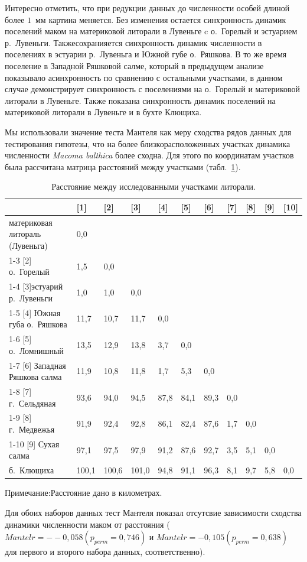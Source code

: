 Интересно отметить, что при редукции данных до численности особей длиной более $1$~мм картина меняется.
Без изменения остается синхронность динамик поселений маком на материковой литорали в Лувеньге c о.~Горелый и эстуарием р.~Лувеньги.
Такжесохранияется синхронность динамик численности в поселениях в эстуарии р.~Лувеньга и Южной губе о.~Ряшкова.
В то же время поселение в Западной Ряшковой салме, который в предыдущем анализе показывало асинхронность по сравнению с остальными участками, в данном случае демонстрирует синхронность с поселениями на о.~Горелый и материковой литорали в Лувеньге.
Также показана синхронность динамик поселений на материковой литорали в Лувеньге и в бухте Клющиха.

Мы использовали значение теста Мантеля как меру сходства рядов данных для тестирования гипотезы, что на более близкорасположенных участках динамика численности {\it Macoma balthica} более сходна.
Для этого по координатам участков была рассчитана матрица расстояний между участками (табл.~\ref{tab:distance_area_km}).
	\begin{table}[ht]
	\caption{Расстояние между исследованными участками литорали.}
	\label{tab:distance_area_km}
        \begin{tabular}{|p{}|*{10}{p{}|}} \hline
	 & [1] & [2] & [3] & [4] & [5] & [6] & [7] & [8] & [9] & [10]
	\\ \hline
	[1] материковая литораль (Лувеньга) & 0,0 &  &  &  &  &  &  &  &  & 
	\\ \cline{1-3}
	[2] о.~Горелый & 1,5 & 0,0 &  &  &  &  &  &  &  &  
	\\ \cline{1-4}
	[3]эстуарий р.~Лувеньги & 1,0 & 1,0 & 0,0 &  &  &  &  &  &  &  
	\\ \cline{1-5}
	[4] Южная губа о.~Ряшкова & 11,7 & 10,7 & 11,7 & 0,0 &  &  &  &  &  & 
	\\ \cline{1-6}
	[5] о.~Ломнишный & 13,5 & 12,9 & 13,8 & 3,7 & 0,0 &  &  &  &  &  
	\\ \cline{1-7}
	[6] Западная Ряшкова салма & 11,9 & 10,8 & 11,8 & 1,7 & 5,3 & 0,0 &  &  &  &  
	\\ \cline{1-8}
	[7] г.~Сельдяная & 93,6 & 94,0 & 94,5 & 87,8 & 84,1 & 89,3 & 0,0 &  &  &  
	\\ \cline{1-9}
	[8] г.~Медвежья & 91,9 & 92,4 & 92,8 & 86,1 & 82,4 & 87,6 & 1,7 & 0,0 &  &  
	\\ \cline{1-10}
	[9] Сухая салма & 97,1 & 97,5 & 97,9 & 91,2 & 87,6 & 92,7 & 3,5 & 5,1 & 0,0 &  
	\\ \hline
	[10] б.~Клющиха & 100,1 & 100,6 & 101,0 & 94,8 & 91,1 & 96,3 & 8,1 & 9,7 & 5,8 & 0,0
	\\ \hline
	\end{tabular}
	   {\footnotesize Примечание:Расстояние дано в километрах.}
	\end{table}

Для обоих наборов данных тест Мантеля показал отсутсвие зависимости сходства динамики численности маком от расстояния ( $Mantel r = --0,058 (p_{perm} = 0,746)$ и $Mantel r = -0,105 (p_{perm} = 0,638)$ для первого и второго набора данных, соответственно).



